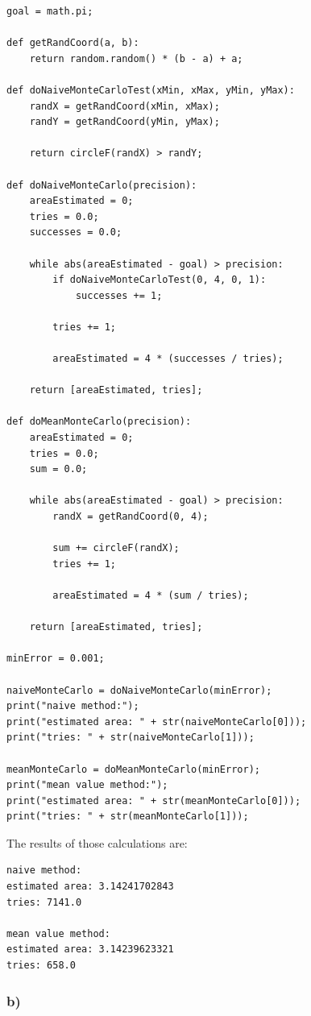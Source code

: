 \begin{lstlisting}[caption=Problem 7.12 a)]
goal = math.pi;

def getRandCoord(a, b):
	return random.random() * (b - a) + a;

def doNaiveMonteCarloTest(xMin, xMax, yMin, yMax):
	randX = getRandCoord(xMin, xMax);
	randY = getRandCoord(yMin, yMax);
	
	return circleF(randX) > randY;

def doNaiveMonteCarlo(precision):
	areaEstimated = 0;
	tries = 0.0;
	successes = 0.0;

	while abs(areaEstimated - goal) > precision:
		if doNaiveMonteCarloTest(0, 4, 0, 1):
			successes += 1;
		
		tries += 1;
		
		areaEstimated = 4 * (successes / tries);
	
	return [areaEstimated, tries];

def doMeanMonteCarlo(precision):
	areaEstimated = 0;
	tries = 0.0;
	sum = 0.0;
	
	while abs(areaEstimated - goal) > precision:
		randX = getRandCoord(0, 4);
		
		sum += circleF(randX);
		tries += 1;
		
		areaEstimated = 4 * (sum / tries);
	
	return [areaEstimated, tries];

minError = 0.001;

naiveMonteCarlo = doNaiveMonteCarlo(minError);
print("naive method:");
print("estimated area: " + str(naiveMonteCarlo[0]));
print("tries: " + str(naiveMonteCarlo[1]));

meanMonteCarlo = doMeanMonteCarlo(minError);
print("mean value method:");
print("estimated area: " + str(meanMonteCarlo[0]));
print("tries: " + str(meanMonteCarlo[1]));
\end{lstlisting}

The results of those calculations are:

\begin{lstlisting}[caption=Result of 7.12 a), keywordstyle=\color{black}]
naive method:
estimated area: 3.14241702843
tries: 7141.0

mean value method:
estimated area: 3.14239623321
tries: 658.0
\end{lstlisting}


\subsubsection{b)}

